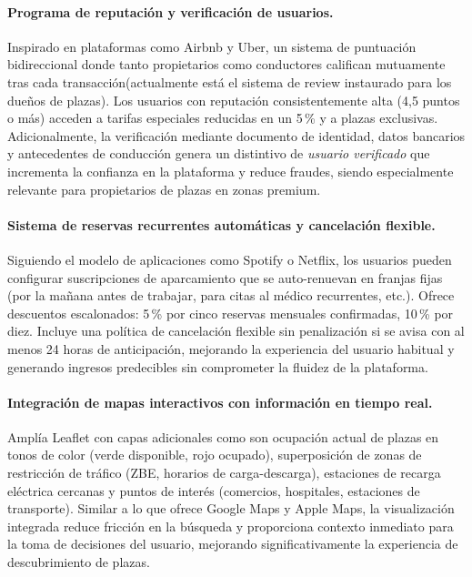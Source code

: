 \paragraph{Programa de reputación y verificación de usuarios.}
Inspirado en plataformas como Airbnb y Uber, un sistema de puntuación bidireccional donde tanto propietarios como conductores califican mutuamente tras cada transacción(actualmente está el sistema de review instaurado para los dueños de plazas). Los usuarios con reputación consistentemente alta (4,5 puntos o más) acceden a tarifas especiales reducidas en un 5\,\% y a plazas exclusivas. Adicionalmente, la verificación mediante documento de identidad, datos bancarios y antecedentes de conducción genera un distintivo de \textit{usuario verificado} que incrementa la confianza en la plataforma y reduce fraudes, siendo especialmente relevante para propietarios de plazas en zonas premium.

\paragraph{Sistema de reservas recurrentes automáticas y cancelación flexible.}
Siguiendo el modelo de aplicaciones como Spotify o Netflix, los usuarios pueden configurar suscripciones de aparcamiento que se auto-renuevan en franjas fijas (por la mañana antes de trabajar, para citas al médico recurrentes, etc.). Ofrece descuentos escalonados: 5\,\% por cinco reservas mensuales confirmadas, 10\,\% por diez. Incluye una política de cancelación flexible sin penalización si se avisa con al menos 24 horas de anticipación, mejorando la experiencia del usuario habitual y generando ingresos predecibles sin comprometer la fluidez de la plataforma.

\paragraph{Integración de mapas interactivos con información en tiempo real.}
Amplía Leaflet con capas adicionales como son ocupación actual de plazas en tonos de color (verde disponible, rojo ocupado), superposición de zonas de restricción de tráfico (ZBE, horarios de carga-descarga), estaciones de recarga eléctrica cercanas y puntos de interés (comercios, hospitales, estaciones de transporte). Similar a lo que ofrece Google Maps y Apple Maps, la visualización integrada reduce fricción en la búsqueda y proporciona contexto inmediato para la toma de decisiones del usuario, mejorando significativamente la experiencia de descubrimiento de plazas.

